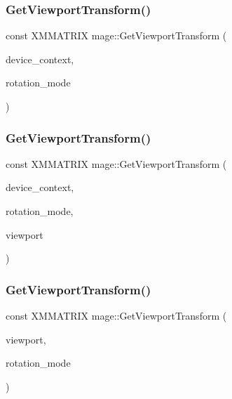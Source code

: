 \hypertarget{namespacemage_a706e1b2866209b405f52e62c521f4884}{}\label{namespacemage_a706e1b2866209b405f52e62c521f4884} 
\subsubsection{\texorpdfstring{Get\+Viewport\+Transform()}{GetViewportTransform()}\hspace{0.1cm}{\footnotesize\ttfamily [1/3]}}
{\footnotesize\ttfamily const X\+M\+M\+A\+T\+R\+IX mage\+::\+Get\+Viewport\+Transform (\begin{DoxyParamCaption}\item[{I\+D3\+D11\+Device\+Context $\ast$}]{device\+\_\+context,  }\item[{D\+X\+G\+I\+\_\+\+M\+O\+D\+E\+\_\+\+R\+O\+T\+A\+T\+I\+ON}]{rotation\+\_\+mode }\end{DoxyParamCaption})}

\hypertarget{namespacemage_a6430737590c5401384e3a65a4f66b240}{}\label{namespacemage_a6430737590c5401384e3a65a4f66b240} 
\subsubsection{\texorpdfstring{Get\+Viewport\+Transform()}{GetViewportTransform()}\hspace{0.1cm}{\footnotesize\ttfamily [2/3]}}
{\footnotesize\ttfamily const X\+M\+M\+A\+T\+R\+IX mage\+::\+Get\+Viewport\+Transform (\begin{DoxyParamCaption}\item[{I\+D3\+D11\+Device\+Context $\ast$}]{device\+\_\+context,  }\item[{D\+X\+G\+I\+\_\+\+M\+O\+D\+E\+\_\+\+R\+O\+T\+A\+T\+I\+ON}]{rotation\+\_\+mode,  }\item[{D3\+D11\+\_\+\+V\+I\+E\+W\+P\+O\+RT $\ast$}]{viewport }\end{DoxyParamCaption})}

\hypertarget{namespacemage_a18ab56ec4969343a6552a73b561ad4ed}{}\label{namespacemage_a18ab56ec4969343a6552a73b561ad4ed} 
\subsubsection{\texorpdfstring{Get\+Viewport\+Transform()}{GetViewportTransform()}\hspace{0.1cm}{\footnotesize\ttfamily [3/3]}}
{\footnotesize\ttfamily const X\+M\+M\+A\+T\+R\+IX mage\+::\+Get\+Viewport\+Transform (\begin{DoxyParamCaption}\item[{const D3\+D11\+\_\+\+V\+I\+E\+W\+P\+O\+RT \&}]{viewport,  }\item[{D\+X\+G\+I\+\_\+\+M\+O\+D\+E\+\_\+\+R\+O\+T\+A\+T\+I\+ON}]{rotation\+\_\+mode }\end{DoxyParamCaption})}

